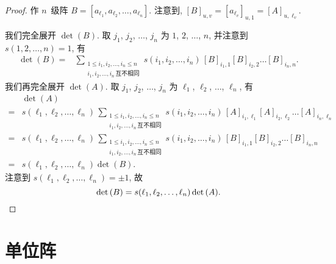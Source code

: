 \begin{proof}
    作 \(n\)~级阵
    \(
    B = [a_{\ell_1}, a_{\ell_2}, \dots, a_{\ell_n}].
    \)
    注意到, \([B]_{u,v} = [a_{\ell_v}]_{u,1}
        = [A]_{u,\ell_v}\).

    我们完全展开 \(\det {(B)}\).
    取 \(j_1\), \(j_2\), \(\dots\), \(j_n\)
    为 \(1\), \(2\), \(\dots\), \(n\),
    并注意到 \(s(1, 2, \dots, n) = 1\),
    有
    \begin{align*}
        \det {(B)}
        = {} &
        \sum_{\substack{
        1 \leq i_1, i_2, \dots, i_n \leq n \\
                i_1, i_2, \dots, i_n\,\text{互不相同}
            }}
        {s(i_1, i_2, \dots, i_n)\,
            [B]_{i_1,1} [B]_{i_2,2}
            \dots [B]_{i_n,n}}.
    \end{align*}
    我们再完全展开 \(\det {(A)}\).
    取 \(j_1\), \(j_2\), \(\dots\), \(j_n\)
    为 \(\ell_1\), \(\ell_2\), \(\dots\), \(\ell_n\),
    有
    \begin{align*}
             & \det {(A)}
        \\
        = {} &
        s(\ell_1, \ell_2, \dots, \ell_n)\,
        \sum_{\substack{
        1 \leq i_1, i_2, \dots, i_n \leq n      \\
                i_1, i_2, \dots, i_n\,\text{互不相同}
            }}
        {s(i_1, i_2, \dots, i_n)\,
            [A]_{i_1,\ell_1} [A]_{i_2,\ell_2}
            \dots [A]_{i_n,\ell_n}}
        \\
        = {} &
        s(\ell_1, \ell_2, \dots, \ell_n)\,
        \sum_{\substack{
        1 \leq i_1, i_2, \dots, i_n \leq n      \\
                i_1, i_2, \dots, i_n\,\text{互不相同}
            }}
        {s(i_1, i_2, \dots, i_n)\,
            [B]_{i_1,1} [B]_{i_2,2}
            \dots [B]_{i_n,n}}
        \\
        = {} & s(\ell_1, \ell_2, \dots, \ell_n)
        \det {(B)}.
    \end{align*}
    注意到 \(s(\ell_1, \ell_2, \dots, \ell_n) = \pm 1\),
    故
    \begin{equation*}
        \det {(B)}
        = s(\ell_1, \ell_2, \dots, \ell_n)
        \det {(A)}.
        \qedhere
    \end{equation*}
\end{proof}

\section{单位阵}

